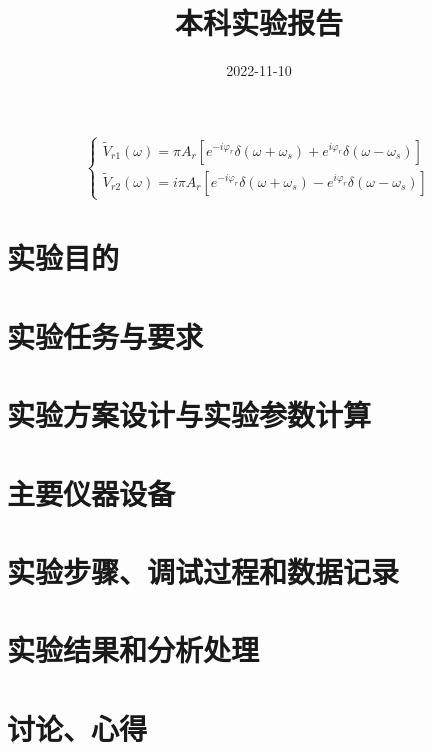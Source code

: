 \documentclass{zjureport}
\title{本科实验报告}
\date{2022-11-10}
\begin{document}
\makecover


\makeheader



\begin{equation}
    \left\{\begin{array}{l}
    \tilde{V}_{r 1}(\omega)=\pi A_r\left[e^{-i \varphi_r} \delta\left(\omega+\omega_s\right)+e^{i \varphi_r} \delta\left(\omega-\omega_s\right)\right] \\
    \tilde{V}_{r 2}(\omega)=i \pi A_r\left[e^{-i \varphi_r} \delta\left(\omega+\omega_s\right)-e^{i \varphi_r} \delta\left(\omega-\omega_s\right)\right]
    \end{array}\right.
\end{equation}




\section{实验目的}


\section{实验任务与要求}


\section{实验方案设计与实验参数计算}


\section{主要仪器设备}


\section{实验步骤、调试过程和数据记录}


\section{实验结果和分析处理}


\section{讨论、心得}
\end{document}
